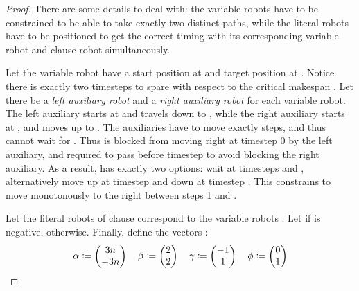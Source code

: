\begin{proof}

	There are some details to deal with: the variable robots have to be constrained to be able to take exactly two distinct paths, while the literal robots have to be positioned to get the correct timing with its corresponding variable robot and clause robot simultaneously.

	Let the variable robot  have a start position at  and target position at . Notice there is exactly two timesteps to spare with respect to the critical makespan . Let there be a \emph{left auxiliary robot} and a \emph{right auxiliary robot} for each variable robot. The left auxiliary starts at  and travels down to , while the right auxiliary starts at , and moves up to . The auxiliaries have to move exactly  steps, and thus cannot wait for . Thus  is blocked from moving right at timestep 0 by the left auxiliary, and required to pass  before timestep  to avoid blocking the right auxiliary. As a result,  has exactly two options: wait at timesteps  and , alternatively move up at timestep  and down at timestep . This constrains  to move monotonously to the right between steps 1 and .


	Let the literal robots  of clause  correspond to the variable robots . Let  if  is negative,  otherwise. Finally, define the vectors \ilmath{\set{\alpha,\ \beta,\ \gamma,\ \phi}}:
	\begin{align*}
	\alpha \coloneqq \begin{pmatrix} 3n \\ -3n \end{pmatrix} \quad 
	\beta \coloneqq \begin{pmatrix} 2 \\ 2 \end{pmatrix} \quad 
	\gamma \coloneqq \begin{pmatrix} -1 \\ 1 \end{pmatrix} \quad 
	\phi \coloneqq \begin{pmatrix} 0 \\ 1 \end{pmatrix}
	\end{align*}


\end{proof}
